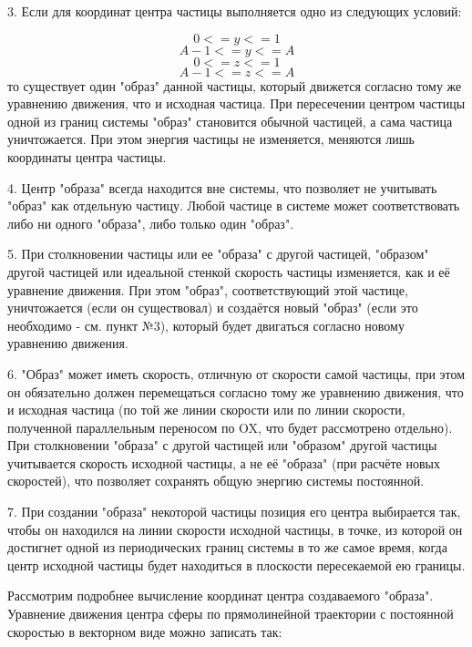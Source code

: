 \documentclass[a4paper]{article}
\begin{document}
3. Если для координат центра частицы выполняется одно из следующих условий:

\begin{equation}
0 <= y <= 1
\end{equation}
\begin{equation}
A - 1 <= y <= A
\end{equation}
\begin{equation}
0 <= z <= 1
\end{equation}
\begin{equation}
A - 1 <= z <= A
\end{equation}
то существует один "образ" данной частицы, который движется согласно тому же уравнению движения, что и исходная частица. При пересечении центром частицы одной из границ системы "образ" становится обычной частицей, а сама частица уничтожается. При этом энергия частицы не изменяется, меняются лишь координаты центра частицы.

4. Центр "образа" всегда находится вне системы, что позволяет не учитывать "образ" как отдельную частицу. Любой частице в системе может соответствовать либо ни одного "образа", либо только один "образ".

5. При столкновении частицы или ее "образа" с другой частицей, "образом" другой частицей или идеальной стенкой скорость частицы изменяется, как и её уравнение движения. При этом "образ", соответствующий этой частице, уничтожается (если он существовал) и создаётся новый "образ" (если это необходимо - см. пункт №3), который будет двигаться согласно новому уравнению движения.

6. "Образ" может иметь скорость, отличную от скорости самой частицы, при этом он обязательно должен перемещаться согласно тому же уравнению движения, что и исходная частица (по той же линии скорости или по линии скорости, полученной параллельным переносом по OX, что будет рассмотрено отдельно). При столкновении "образа" с другой частицей или "образом" другой частицы учитывается скорость исходной частицы, а не её "образа" (при расчёте новых скоростей), что позволяет сохранять общую энергию системы постоянной.

7. При создании "образа" некоторой частицы позиция его центра выбирается так, чтобы он находился на линии скорости исходной частицы, в точке, из которой он достигнет одной из периодических границ системы в то же самое время, когда центр исходной частицы будет находиться в плоскости пересекаемой ею границы.

Рассмотрим подробнее вычисление координат центра создаваемого "образа". Уравнение движения центра сферы по прямолинейной траектории с постоянной скоростью в векторном виде можно записать так:
\end{document}
